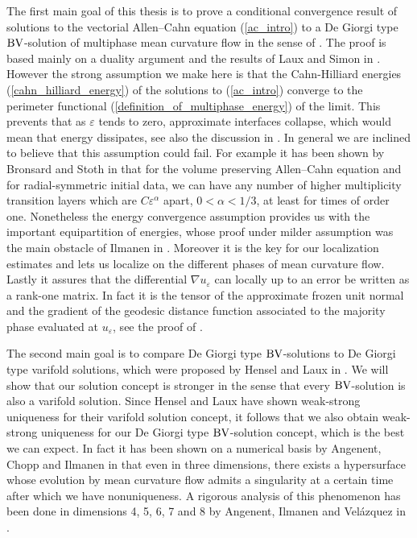 The first main goal of this thesis is to prove a conditional convergence result 
of solutions to the vectorial Allen--Cahn equation (\ref{ac_intro}) to a De 
Giorgi type $ \operatorname{BV} $-solution of multiphase mean curvature flow in the sense of 
. The proof is based mainly on a duality 
argument and the results of Laux and Simon in 
\cite{convergence_of_allen_cahn_equation_to_multiphase_mean_curvature_flow}.
However the strong assumption we make here is that the Cahn-Hilliard energies 
(\ref{cahn_hilliard_energy}) of the solutions to (\ref{ac_intro}) converge to 
the perimeter functional (\ref{definition_of_multiphase_energy}) of the limit. 
This prevents that as $ \varepsilon $ tends to zero, approximate interfaces 
collapse, which would mean that energy dissipates, see also the discussion in
.  In general we are 
inclined to believe that this assumption could fail. For example it has been 
shown by Bronsard and Stoth in 
\cite{bronsard_stoth_on_the_existence_of_high_multiplicity_interfaces}
that for the volume preserving Allen--Cahn equation and for radial-symmetric 
initial data, we can have any number of higher 
multiplicity transition layers which are $ C \varepsilon^{ \alpha } $ apart, $ 
0 < \alpha < 1/3 $, at least for times of order one.
Nonetheless the energy 
convergence assumption provides us with the important equipartition of 
energies, whose proof under milder assumption was the main obstacle of Ilmanen 
in \cite{ilmanen_convergence_of_ac_to_brakkes_mcf}. Moreover it is the key for 
our localization estimates and lets us localize on the different phases of mean 
curvature flow. Lastly it assures that the differential $ \nabla u_{ 
\varepsilon } $ can locally up to an error be written as a rank-one matrix. In 
fact it
is the tensor of the approximate frozen unit normal and the gradient of the 
geodesic 
distance function associated to the majority phase evaluated at $ u_{ 
\varepsilon } $, see the proof of .

The second main goal is to compare De Giorgi type $ \operatorname{BV} $-solutions to De 
Giorgi type varifold solutions, which were 
proposed by Hensel and Laux in 
\cite{hensel_laux_varifold_solution_concept_for_mean_curvature_flow}. We will 
show that our solution concept is stronger in the sense that every $ \operatorname{BV} 
$-solution is also a varifold solution. Since Hensel and Laux have shown 
weak-strong uniqueness for their varifold solution concept, it follows that we 
also obtain weak-strong uniqueness for our De Giorgi type $ \operatorname{BV} $-solution 
concept, which is the best we can expect. In fact it has been shown on a 
numerical basis by Angenent, Chopp and Ilmanen in 
\cite{angenent_chopp_ilmanen_a_computed_example_of_nonuniqueness_of_mcf}
that even in three dimensions, there exists a hypersurface whose evolution by 
mean curvature 
flow admits a singularity at a certain time after which we have nonuniqueness. 
A rigorous analysis of this phenomenon has been done in dimensions 4, 5, 6, 7 
and 8 by Angenent, Ilmanen and Velázquez in 
\cite{angenent_chopp_ilmanen_a_computed_example_of_nonuniqueness_of_mcf}.

